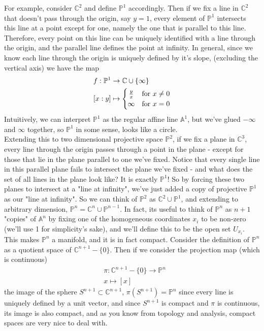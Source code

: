 \documentclass[psamsfonts]{amsart}
\theoremstyle{definition}
\theoremstyle{remark}
\newcommand{\C}{\mathbb{C}}
\newcommand{\A}{\mathbb{A}}
\newcommand{\p}{\mathbb{P}}
\begin{document}
For example, consider $\C^2$ and define $\p^1$ accordingly. Then if we fix a line in $\C^2$ that doesn't pass through the origin, say $y = 1$, every element of $\p^1$ intersects this line at a point except for one, namely the one that is parallel to this line. Therefore, every point on this line can be uniquely identified with a line through the origin, and the parallel line defines the point at infinity. In general, since we know each line through the origin is uniquely defined by it's slope, (excluding the vertical axis) we have the map 
\begin{align*}
&f: \p^1 \to \C \cup \{\infty\} \\
&[x:y] \mapsto \begin{cases} \hfill \frac{y}{x} \hfill & $for $ x \neq 0 \\
\hfill \infty \hfill & $for $ x = 0
 \end{cases}
\end{align*}
Intuitively, we can interpret $\p^1$ as the regular affine line $\A^1$, but we've glued $-\infty$ and $\infty$ together, so $\p^1$ in some sense, looks like a circle.\\

Extending this to two dimensional projective space $\p^2$, if we fix a plane in $\C^3$, every line through the origin passes through a point in the plane - except for those that lie in the plane parallel to one we've fixed. Notice that every single line in this parallel plane fails to intersect the plane we've fixed - and what does the set of all lines in the plane look like? It is exactly $\p^1$! So by forcing  these two planes to intersect at a "line at infinity", we've just added a copy of projective $\p^1$ as our "line at infinity". So we can think of $\p^2$ as $\C^2 \cup \p^1$, and extending to arbitrary dimension, $\p^n = \C^n \cup \p^{n-1}$. In fact, its useful to think of $\p^n$ as $n+1$ "copies" of $\A^n$ by fixing one of the homogeneous coordinates $x_i$ to be non-zero (we'll use 1 for simplicity's sake), and we'll define this to be the open set $U_{x_i}$. This makes $\p^n$ a manifold, and it is in fact compact. Consider the definition of $\p^n$ as a quotient space of $\C^{n+1} - \{0\}$. Then if we consider the projection map (which is continuous)
\begin{align*}
&\pi : \C^{n+1} - \{0\} \to \p^n \\
& x \mapsto [x]
\end{align*}
the image of the sphere $S^{n+1} \subset \C^{n+1}$, $\pi(S^{n+1}) = \p^n$ since every line is uniquely defined by a unit vector, and since $S^{n+1}$ is compact and $\pi$ is continuous, its image is also compact, and as you know from topology and analysis, compact spaces are very nice to deal with.
\end{document}
